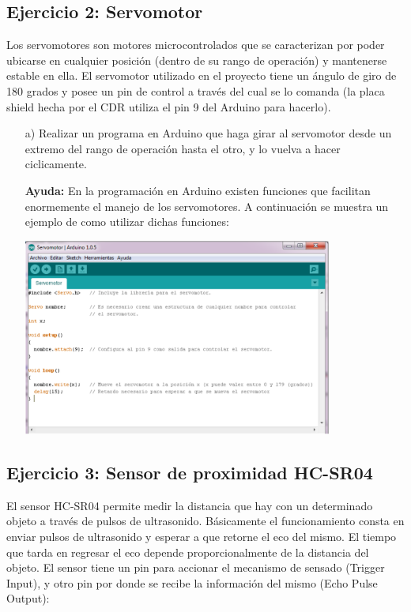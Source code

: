 \documentclass[a4paper,11pt]{article}
\begin{document}
\subsection*{Ejercicio 2: Servomotor}Los servomotores son motores microcontrolados que se caracterizan por poder ubicarse en cualquier posición (dentro de su rango de operación) y mantenerse estable en ella. El servomotor utilizado en el proyecto tiene un ángulo de giro de 180 grados y posee un pin de control a través del cual se lo comanda (la placa shield hecha por el CDR utiliza el pin 9 del Arduino para hacerlo).
\begin{itemize}
		\item[a) ] Realizar un programa en Arduino que haga girar al servomotor desde un extremo del rango de operación hasta el otro, y lo vuelva a hacer ciclicamente.
				
		\textbf{Ayuda:} En la programación en Arduino existen funciones que facilitan enormemente el manejo de los servomotores. A continuación se muestra un ejemplo de como utilizar dichas funciones:
		
\begin{center}
	\includegraphics[width=0.8\textwidth]{fig/figura1.eps} 
\end{center}

\end{itemize}

\subsection*{Ejercicio 3: Sensor de proximidad HC-SR04}
El sensor HC-SR04 permite medir la distancia que hay con un determinado objeto a través de pulsos de ultrasonido. Básicamente el funcionamiento consta en enviar pulsos de ultrasonido y esperar a que retorne el eco del mismo. El tiempo que tarda en regresar el eco depende proporcionalmente de la distancia del objeto. El sensor tiene un pin para accionar el mecanismo de sensado (Trigger Input), y otro pin por donde se recibe la información del mismo (Echo Pulse Output):
\end{document}
